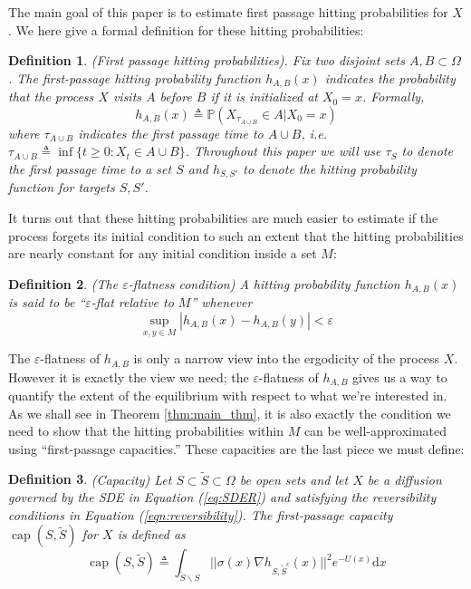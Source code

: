 \documentclass[12pt, nofootinbib,english, amsmath, amssymb, aps, priprint, graphicx,floatfix]{revtex4-1}
\newtheorem{definition}{Definition}
\theoremstyle{plain}
\theoremstyle{definition}
\theoremstyle{plain}
\begin{document}
The main goal of this paper is to estimate first passage hitting probabilities for $X$.  We here give a formal definition for these hitting probabilities:

\begin{definition}(First passage hitting probabilities).  Fix two disjoint sets $A,B\subset \Omega$.  The first-passage hitting probability function $h_{A,B}(x)$ indicates the probability that the process $X$ visits $A$ before $B$ if it is initialized at $X_0=x$.  Formally,
\[ h_{A, B}(x) \triangleq \mathbb{P}(X_{\tau_{A\cup B}}\in A|X_0=x)\]
where $\tau_{A\cup B}$ indicates the first passage time to $A\cup B$, i.e.\ $\tau_{A\cup B} \triangleq \inf \{ t \geqslant 0 : X_t \in A \cup B \}$.  Throughout this paper we will use $\tau_S$ to denote the first passage time to a set $S$ and $h_{S,S'}$ to denote the hitting probability function for targets $S,S'$.
\end{definition}

It turns out that these hitting probabilities are much easier to estimate if the process forgets its initial condition to such an extent that the hitting probabilities are nearly constant for any initial condition inside a set $M$:
\begin{definition}(The $\varepsilon$-flatness condition)  A hitting probability function $h_{A,B}(x)$ is said to be
``$\varepsilon$-flat relative to $M$'' whenever
\[
\sup_{x, y \in M} |h_{A,B}(x) - h_{A,B}(y)| < \varepsilon
\]
\end{definition}
The $\varepsilon$-flatness of $h_{A,B}$ is only a narrow view into the ergodicity of the process $X$.  However it is exactly the view we need; the $\varepsilon$-flatness of $h_{A,B}$ gives us a way to quantify the extent of the equilibrium with respect to what we're interested in.  As we shall see in Theorem \ref{thm:main_thm}, it is also exactly the condition we need to show that the hitting probabilities within $M$ can be well-approximated using ``first-passage capacities.''  These capacities are the last piece we must define:

\begin{definition}(Capacity)
Let $S \subset \tilde{S} \subset \Omega$ be open sets and let $X$ be a diffusion governed by the SDE in Equation (\ref{eq:SDER}) and satisfying the reversibility conditions in Equation (\ref{eqn:reversibility}).  The first-passage capacity $\ensuremath{\operatorname{cap}} (S, \tilde{S})$ for $X$ is defined as
%
\[ \ensuremath{\operatorname{cap}} (S, \tilde{S}) \triangleq \int_{\tilde S \backslash S}
||\sigma(x) \nabla h_{S, \tilde{S}^c}(x)||^2 e^{- U(x)} \mathrm{d} x \]
%
\end{definition}
\end{document}
